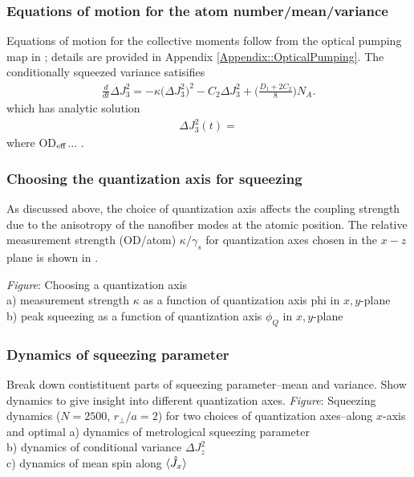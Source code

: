 \documentclass[preprint,aps,pra,onecolumn]{revtex4-1} %
\newcommand{\comment}[1]{{\color{Maroon} #1}}
\begin{document}
		
		\subsubsection{Equations of motion for the atom number/mean/variance}		

Equations of motion for the collective moments follow from the optical pumping map in ; details are provided in Appendix \ref{Appendix::OpticalPumping}. The conditionally squeezed variance satisifies 	
	\begin{align} \label{Eq::J3variance}
		\frac{d}{dt} \Delta J_3^2 = - \kappa \big( \Delta J_3^2 \big)^2 - C_2 \Delta J_3^2 + \bigg( \frac{D_1 + 2C_2}{8} \bigg) N_A . 
	\end{align}
which has analytic solution \cite{baragiola_three-dimensional_2014}
	\begin{align}
		\Delta J_3^2(t) = 
	\end{align}
where OD$_{\rm eff}$... . 

\subsubsection{Choosing the quantization axis for squeezing}
As discussed above, the choice of quantization axis affects the coupling strength due to the anisotropy of the nanofiber modes at the atomic position. The relative measurement strength (OD/atom) $\kappa/\gamma_s$ for quantization axes chosen in the $x-z$ plane is shown in \frf{}.

\comment{\emph{Figure}: Choosing a quantization axis\\
a) measurement strength $\kappa$ as a function of quantization axis phi in $x,y$-plane\\
b) peak squeezing as a function of quantization axis $\phi_Q$ in $x,y$-plane}

\subsubsection{Dynamics of squeezing parameter}
Break down contistituent parts of squeezing parameter--mean and variance. Show dynamics to give insight into different quantization axes.
\comment{
\emph{Figure}:  Squeezing dynamics ($N=2500$, $r_\perp/a = 2$) for two choices of quantization axes--along $x$-axis and optimal
a) dynamics of metrological squeezing parameter \\
b) dynamics of conditional variance $\Delta J_z^2$ \\
c) dynamics of mean spin along $\langle{\hat{J}_x}\rangle$
}
\end{document}
